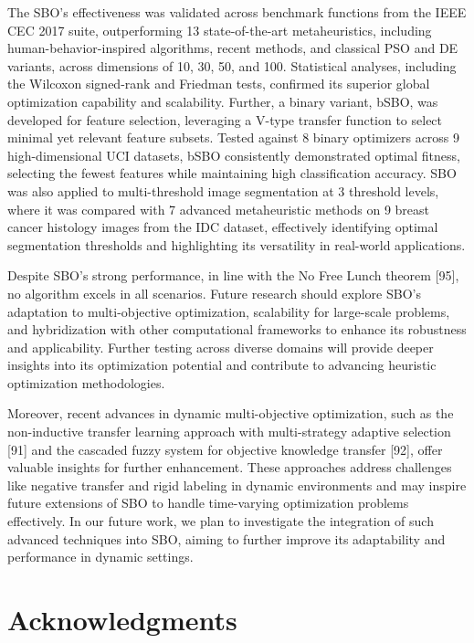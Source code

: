 \documentclass{article} %
\begin{document}
The SBO's effectiveness was validated across benchmark functions from the IEEE CEC 2017 suite, outperforming 13 state-of-the-art metaheuristics, including human-behavior-inspired algorithms, recent methods, and classical PSO and DE variants, across dimensions of 10, 30, 50, and 100. Statistical analyses, including the Wilcoxon signed-rank and Friedman tests, confirmed its superior global optimization capability and scalability. Further, a binary variant, bSBO, was developed for feature selection, leveraging a V-type transfer function to select minimal yet relevant feature subsets. Tested against 8 binary optimizers across 9 high-dimensional UCI datasets, bSBO consistently demonstrated optimal fitness, selecting the fewest features while maintaining high classification accuracy. SBO was also applied to multi-threshold image segmentation at 3 threshold levels, where it was compared with 7 advanced metaheuristic methods on 9 breast cancer histology images from the IDC dataset, effectively identifying optimal segmentation thresholds and highlighting its versatility in real-world applications.

Despite SBO's strong performance, in line with the No Free Lunch theorem [95], no algorithm excels in all scenarios. Future research should explore SBO's adaptation to multi-objective optimization, scalability for large-scale problems, and hybridization with other computational frameworks to enhance its robustness and applicability. Further testing across diverse domains will provide deeper insights into its optimization potential and contribute to advancing heuristic optimization methodologies.

Moreover, recent advances in dynamic multi-objective optimization, such as the non-inductive transfer learning approach with multi-strategy adaptive selection [91] and the cascaded fuzzy system for objective knowledge transfer [92], offer valuable insights for further enhancement. These approaches address challenges like negative transfer and rigid labeling in dynamic environments and may inspire future extensions of SBO to handle time-varying optimization problems effectively. In our future work, we plan to investigate the integration of such advanced techniques into SBO, aiming to further improve its adaptability and performance in dynamic settings.

\noindent 
\section{Acknowledgments}
\end{document}
